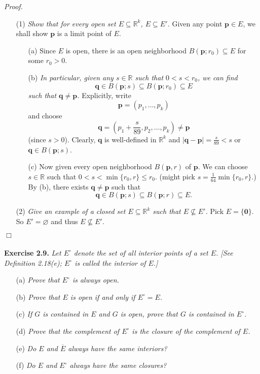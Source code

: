 \documentclass{article}
\begin{document}
\emph{Proof.}
\begin{enumerate}
\item[(1)]
\emph{Show that for every open set $E \subseteq \mathbb{R}^k$, $E \subseteq E'$.}
Given any point $\mathbf{p} \in E$, we shall show $\mathbf{p}$ is a limit point of $E$.
  \begin{enumerate}
  \item[(a)]
  Since $E$ is open, there is an open neighborhood $B(\mathbf{p};r_0) \subseteq E$
  for some $r_0 > 0$.
  \item[(b)]
  \emph{In particular, given any $s \in \mathbb{R}$ such that $0 < s < r_0$, we can find
  $$\mathbf{q} \in B(\mathbf{p};s) \subseteq B(\mathbf{p};r_0) \subseteq E$$
  such that $\mathbf{q} \neq \mathbf{p}$.}
  Explicitly, write $$\mathbf{p} = (p_1, \ldots, p_k)$$ and
  choose
  $$\mathbf{q} = \left(p_1 + \frac{s}{89}, p_2, \ldots, p_k\right) \neq \mathbf{p}$$
  (since $s > 0$).
  Clearly, $\mathbf{q}$ is well-defined in $\mathbb{R}^k$ and
  $|\mathbf{q} - \mathbf{p}| = \frac{s}{89} < s$ or $\mathbf{q} \in B(\mathbf{p};s)$.
  \item[(c)]
  Now given every open neighborhood $B(\mathbf{p}, r)$ of $\mathbf{p}$.
  We can choose $s \in \mathbb{R}$ such that $0 < s < \min\{r_0,r\} \leq r_0$.
  (might pick $s = \frac{1}{64}\min\{r_0,r\}$.)
  By (b), there exists $\mathbf{q} \neq \mathbf{p}$ such that
  $$\mathbf{q} \in B(\mathbf{p};s) \subseteq B(\mathbf{p};r) \subseteq E.$$
  \end{enumerate}
\item[(2)]
\emph{Give an example of a closed set $E \subseteq \mathbb{R}^k$ such that $E \not\subseteq E'$.}
Pick $E = \{ \mathbf{0} \}$.
So $E' = \varnothing$ and thus $E \not\subseteq E'$.
\end{enumerate}
$\Box$ \\\\






\textbf{Exercise 2.9.}
\emph{Let $E^\circ$ denote the set of all interior points of a set $E$.
[See Definition 2.18(e); $E^\circ$ is called the interior of $E$.]}
\begin{enumerate}
\item[(a)]
\emph{Prove that $E^\circ$ is always open.}
\item[(b)]
\emph{Prove that $E$ is open if and only if $E^\circ = E$.}
\item[(c)]
\emph{If $G$ is contained in $E$ and $G$ is open,
prove that $G$ is contained in $E^\circ$.}
\item[(d)]
\emph{Prove that the complement of $E^\circ$ is the closure of the
complement of $E$.}
\item[(e)]
\emph{Do $E$ and $\overline{E}$ always have the same interiors?}
\item[(f)]
\emph{Do $E$ and $E^\circ$ always have the same closures?} \\
\end{enumerate}
\end{document}
